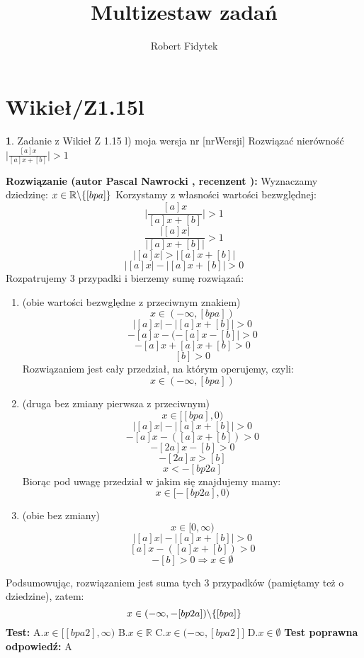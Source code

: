 \documentclass[12pt, a4paper]{article}
\title{Multizestaw zadań}
\author{Robert Fidytek}
\date{}
\theoremstyle{definition} %
\newtheorem{zad}{}
\newcommand{\kategoria}[1]{\section{#1}} %
\newcommand{\zadStart}[1]{\begin{zad}#1\newline} %
\newcommand{\zadStop}{\end{zad}}   %
\newcommand{\rozwStart}[2]{\noindent \textbf{Rozwiązanie (autor #1 , recenzent #2): }\newline} %
\newcommand{\odpStop}{\newline}                                             %
\newcommand{\testStart}{\noindent \textbf{Test:}\newline} %
\newcommand{\testStop}{\newline} %
\newcommand{\kluczStart}{\noindent \textbf{Test poprawna odpowiedź:}\newline} %
\newcommand{\kluczStop}{\newline} %
\begin{document}
\maketitle



\kategoria{Wikieł/Z1.15l}
\zadStart{Zadanie z Wikieł Z 1.15 l) moja wersja nr [nrWersji]}
Rozwiązać nierówność $\big|\frac{[a]x}{[a]x+[b]}\big|>1$
\zadStop
\rozwStart{Pascal Nawrocki}{}
Wyznaczamy dziedzinę: $x\in\mathbb{R}\symbol{92}\{[bpa]\}$
Korzystamy z własności wartości bezwględnej:
$$\big|\frac{[a]x}{[a]x+[b]}\big|>1$$
$$\frac{|[a]x|}{|[a]x+[b]|}>1$$
$$|[a]x|>|[a]x+[b]|$$
$$|[a]x|-|[a]x+[b]|>0$$
Rozpatrujemy 3 przypadki i bierzemy sumę rozwiązań:
\begin{enumerate}
\item (obie wartości bezwględne z przeciwnym znakiem) $$x\in(-\infty,[bpa])$$ 
$$|[a]x|-|[a]x+[b]|>0$$
$$-[a]x-(-[a]x-[b]|>0$$
$$-[a]x+[a]x+[b]>0$$
$$[b]>0$$
Rozwiązaniem jest cały przedział, na którym operujemy, czyli:
$$x\in(-\infty,[bpa])$$
\item (druga bez zmiany pierwsza z przeciwnym)$$x\in[[bpa],0)$$ 
$$|[a]x|-|[a]x+[b]|>0$$
$$-[a]x-([a]x+[b])>0$$
$$-[2a]x-[b]>0$$
$$-[2a]x>[b]$$
$$x<-[bp2a]$$
Biorąc pod uwagę przedział w jakim się znajdujemy mamy:
$$x\in[-[bp2a],0)$$
\item (obie bez zmiany) $$x\in[0,\infty)$$ 
$$|[a]x|-|[a]x+[b]|>0$$
$$[a]x-([a]x+[b])>0$$
$$-[b]>0\Rightarrow x\in\emptyset$$
\end{enumerate}
Podsumowując, rozwiązaniem jest suma tych 3 przypadków (pamiętamy też o dziedzine), zatem: $$x\in(-\infty,-[bp2a])\symbol{92}\{[bpa]\}$$
\odpStop
\testStart
A.$x\in[[bpa2],\infty)$
B.$x\in\mathbb{R}$
C.$x\in(-\infty,[bpa2]]$
D.$x\in\emptyset$
\testStop
\kluczStart
A
\kluczStop
\end{document}
